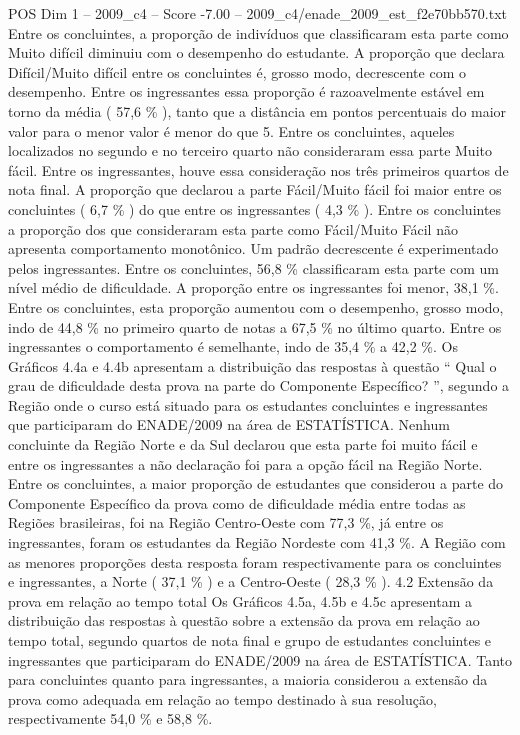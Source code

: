 \begin{textsample}{POS Dim 1 – 2009\_c4 – Score -7.00 – 2009\_c4/enade\_2009\_est\_f2e70bb570.txt}
Entre os concluintes, a proporção de indivíduos que classificaram esta parte como Muito difícil diminuiu com o desempenho do estudante.
A proporção que declara Difícil/Muito difícil entre os concluintes é, grosso modo, decrescente com o desempenho.
Entre os ingressantes essa proporção é razoavelmente estável em torno da média ( 57,6 \% ), tanto que a distância em pontos percentuais do maior valor para o menor valor é menor do que 5.
Entre os concluintes, aqueles localizados no segundo e no terceiro quarto não consideraram essa parte Muito fácil.
Entre os ingressantes, houve essa consideração nos três primeiros quartos de nota final.
A proporção que declarou a parte Fácil/Muito fácil foi maior entre os concluintes ( 6,7 \% ) do que entre os ingressantes ( 4,3 \% ).
Entre os concluintes a proporção dos que consideraram esta parte como Fácil/Muito Fácil não apresenta comportamento monotônico.
Um padrão decrescente é experimentado pelos ingressantes.
Entre os concluintes, 56,8 \% classificaram esta parte com um nível médio de dificuldade.
A proporção entre os ingressantes foi menor, 38,1 \%.
Entre os concluintes, esta proporção aumentou com o desempenho, grosso modo, indo de 44,8 \% no primeiro quarto de notas a 67,5 \% no último quarto.
Entre os ingressantes o comportamento é semelhante, indo de 35,4 \% a 42,2 \%.
Os Gráficos 4.4a e 4.4b apresentam a distribuição das respostas à questão “ Qual o grau de dificuldade desta prova na parte do Componente Específico? ”, segundo a Região onde o curso está situado para os estudantes concluintes e ingressantes que participaram do ENADE/2009 na área de ESTATÍSTICA.
Nenhum concluinte da Região Norte e da Sul declarou que esta parte foi muito fácil e entre os ingressantes a não declaração foi para a opção fácil na Região Norte.
Entre os concluintes, a maior proporção de estudantes que considerou a parte do Componente Específico da prova como de dificuldade média entre todas as Regiões brasileiras, foi na Região Centro-Oeste com 77,3 \%, já entre os ingressantes, foram os estudantes da Região Nordeste com 41,3 \%.
A Região com as menores proporções desta resposta foram respectivamente para os concluintes e ingressantes, a Norte ( 37,1 \% ) e a Centro-Oeste ( 28,3 \% ). 4.2 Extensão da prova em relação ao tempo total Os Gráficos 4.5a, 4.5b e 4.5c apresentam a distribuição das respostas à questão sobre a extensão da prova em relação ao tempo total, segundo quartos de nota final e grupo de estudantes concluintes e ingressantes que participaram do ENADE/2009 na área de ESTATÍSTICA.
Tanto para concluintes quanto para ingressantes, a maioria considerou a extensão da prova como adequada em relação ao tempo destinado à sua resolução, respectivamente 54,0 \% e 58,8 \%.

\end{textsample}

